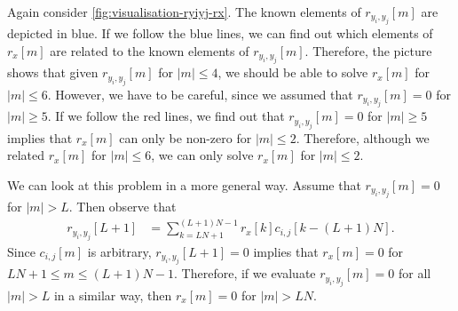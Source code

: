 \documentclass[a4paper, openany, oneside]{memoir}
\begin{document}
Again consider \cref{fig:visualisation-ryiyj-rx}. The known elements of $r_{y_i,y_j}[m]$ are depicted in blue. If we follow the blue lines, we can find out which elements of $r_x[m]$ are related to the known elements of $r_{y_i,y_j}[m]$. Therefore, the picture shows that given $r_{y_i,y_j}[m]$ for $|m| \le 4$, we should be able to solve $r_x[m]$ for $|m| \le 6$. However, we have to be careful, since we assumed that $r_{y_i,y_j}[m]=0$ for $|m| \ge 5$. If we follow the red lines, we find out that $r_{y_i,y_j}[m]=0$ for $|m| \ge 5$ implies that $r_x[m]$ can only be non-zero for $|m| \le 2$. Therefore, although we related $r_x[m]$ for $|m| \le 6$, we can only solve $r_x[m]$ for $|m| \le 2$.

We can look at this problem in a more general way. Assume that $r_{y_i,y_j}[m]=0$ for $|m| > L$. Then observe that
\begin{align*}
    r_{y_i,y_j}[L+1] &= \sum_{k=LN+1}^{(L+1)N-1} r_x[k] c_{i,j}[k-(L+1)N].
\end{align*}
Since $c_{i,j}[m]$ is arbitrary, $r_{y_i,y_j}[L+1]=0$ implies that $r_x[m]=0$ for $LN+1 \le m \le (L+1)N-1$. Therefore, if we evaluate $r_{y_i,y_j}[m]=0$ for all $|m| > L$ in a similar way, then $r_x[m]=0$ for $|m| > LN$.
\end{document}
